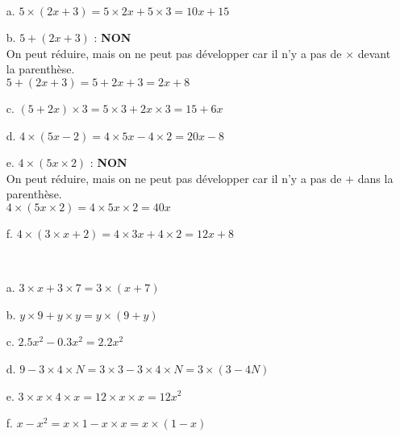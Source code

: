 \documentclass[11pt]{article}
\begin{document}
\\

\begin{enumerate}
    \item[a.] $5 \times (2x + 3) = 5 \times 2x + 5 \times 3 = 10x + 15$
    \item[b.] $5 + (2x + 3)$ : \textbf{NON}\\
    On peut réduire, mais on ne peut pas développer car il n'y a pas de $\times$ devant la parenthèse.\\
    $5 + (2x + 3) =  5 + 2x + 3 = 2x + 8$
    \item[c.] $(5 + 2x) \times 3 = 5  \times 3 + 2x \times 3 = 15 + 6x$
    \item[d.] $4 \times (5x - 2) = 4 \times 5x - 4 \times 2 = 20x - 8$
    \item[e.] $4 \times (5x \times 2)$ : \textbf{NON}\\
    On peut réduire, mais on ne peut pas développer car il n'y a pas de $+$ dans la parenthèse.\\
    $4 \times (5x \times 2) = 4 \times 5x \times 2 = 40x$
    \item[f.] $4 \times (3 \times x + 2) = 4 \times 3x + 4 \times 2 = 12x + 8$
\end{enumerate}


\\

\begin{enumerate}
    \item[a.] $3 \times x + 3 \times 7 = 3 \times (x+7)$
    \item[b.] $y \times 9 + y \times y = y \times (9+y)$
    \item[c.] $2.5x^2 - 0.3x^2 = 2.2x^2$
    \item[d.] $9 - 3 \times 4 \times N = 3 \times 3 - 3 \times 4 \times N = 3 \times (3 - 4N)$
    \item[e.] $3 \times x \times 4 \times x = 12 \times x \times x = 12 x^2$
    \item[f.] $x - x^2 = x \times 1 - x \times x = x \times (1 - x)$
\end{enumerate}   
\end{document}

